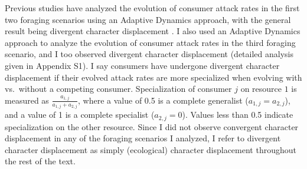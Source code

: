 \documentclass[11pt,]{article}
\begin{document}
Previous studies have analyzed the evolution of consumer attack rates in
the first two foraging scenarios using an Adaptive Dynamics approach,
with the general result being divergent character displacement
\citep{Lawlor1976, Abrams1986}. I also used an Adaptive Dynamics
approach to analyze the evolution of consumer attack rates in the third
foraging scenario, and I too observed divergent character displacement
(detailed analysis given in Appendix S1). I say consumers have undergone
divergent character displacement if their evolved attack rates are more
specialized when evolving with vs.~without a competing consumer.
Specialization of consumer \(j\) on resource \(1\) is measured as
\(\frac{a_{1,j}}{a_{1,j}+a_{2,j}}\), where a value of 0.5 is a complete
generalist (\(a_{1,j}=a_{2,j}\)), and a value of 1 is a complete
specialist (\(a_{2,j}=0\)). Values less than 0.5 indicate specialization
on the other resource. Since I did not observe convergent character
displacement in any of the foraging scenarios I analyzed, I refer to
divergent character displacement as simply (ecological) character
displacement throughout the rest of the text.
\end{document}
